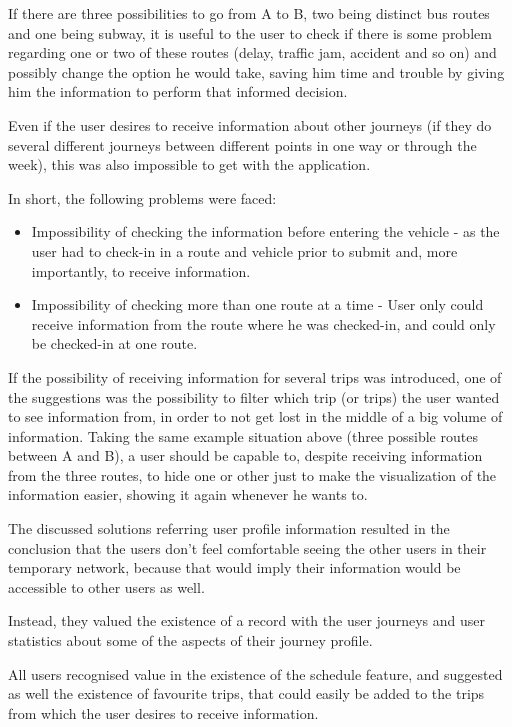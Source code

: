 If there are three possibilities to go from A to B, two being distinct bus routes and one being subway, it is useful to the user to check if there is some problem regarding one  or two of these routes (delay, traffic jam, accident and so on) and possibly change the option he would take, saving him time and trouble by giving him the information to perform that informed decision.

Even if the user desires to receive information about other journeys (if they do several different journeys between different points in one way or through the week), this was also impossible to get with the application.

In short, the following problems were faced: 

\begin{itemize}
\item Impossibility of checking the information before entering the vehicle - as the user had to check-in in a route and vehicle prior to  submit and, more importantly, to receive information. 
\item Impossibility of checking more than one route at a time - User only could receive information from the route where he was checked-in, and could only be checked-in at one route. 
\end{itemize}

If the possibility of receiving information for several trips was introduced, one of the suggestions was the possibility to filter which trip (or trips) the user wanted to see information from, in order to not get lost in the middle of a big volume of information. Taking the same example situation above (three possible routes between A and B), a user should be capable to, despite receiving information from the three routes, to hide one or other just to make the visualization of the information easier, showing it again whenever he wants to. 

The discussed solutions referring user profile information resulted in the conclusion that the users don't feel comfortable seeing the other users in their temporary network, because that would imply their information would be accessible to other users as well. 

Instead, they valued the existence of a record with the user journeys and user statistics about some of the aspects of their journey profile.

All users recognised value in the existence of the schedule feature, and suggested as well the existence of favourite trips, that could easily be added to the trips from which the user desires to receive information.

